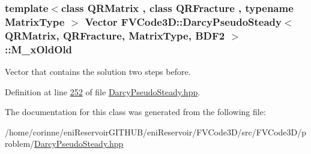 \subsubsection[{\texorpdfstring{M\+\_\+x\+Old\+Old}{M_xOldOld}}]{\setlength{\rightskip}{0pt plus 5cm}template$<$class Q\+R\+Matrix , class Q\+R\+Fracture , typename Matrix\+Type $>$ {\bf Vector} {\bf F\+V\+Code3\+D\+::\+Darcy\+Pseudo\+Steady}$<$ Q\+R\+Matrix, Q\+R\+Fracture, Matrix\+Type, {\bf B\+D\+F2} $>$\+::M\+\_\+x\+Old\+Old\hspace{0.3cm}{\ttfamily [protected]}}\hypertarget{classFVCode3D_1_1DarcyPseudoSteady_3_01QRMatrix_00_01QRFracture_00_01MatrixType_00_01BDF2_01_4_a242abf6d14e7d98a6a3b8fe3daef2276}{}\label{classFVCode3D_1_1DarcyPseudoSteady_3_01QRMatrix_00_01QRFracture_00_01MatrixType_00_01BDF2_01_4_a242abf6d14e7d98a6a3b8fe3daef2276}


Vector that contains the solution two steps before. 



Definition at line \hyperlink{DarcyPseudoSteady_8hpp_source_l00252}{252} of file \hyperlink{DarcyPseudoSteady_8hpp_source}{Darcy\+Pseudo\+Steady.\+hpp}.



The documentation for this class was generated from the following file\+:\begin{DoxyCompactItemize}
\item 
/home/corinne/eni\+Reservoir\+G\+I\+T\+H\+U\+B/eni\+Reservoir/\+F\+V\+Code3\+D/src/\+F\+V\+Code3\+D/problem/\hyperlink{DarcyPseudoSteady_8hpp}{Darcy\+Pseudo\+Steady.\+hpp}\end{DoxyCompactItemize}

